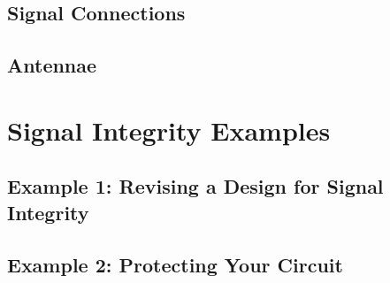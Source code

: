 \subsection{Signal Connections}
\subsection{Antennae}

\section{Signal Integrity Examples}
\subsection{Example 1: Revising a Design for Signal Integrity}
\subsection{Example 2: Protecting Your Circuit}
